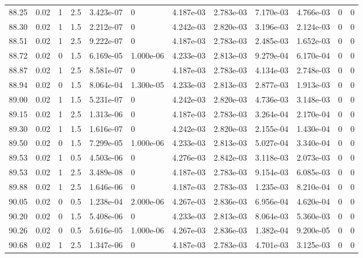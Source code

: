 \documentclass[preview]{standalone}
\begin{document}
{{{{{{{{{{{{{\begin{tabular}{L{1.2cm}C{1.2cm} C{0.3cm}C{0.5cm} C{1.4cm}C{1.4cm} C{1.4cm}C{1.4cm} C{1.6cm}C{1.6cm} C{1.6cm}C{1.6cm}}
  88.25  &  0.02  & 1     & 2.5 &  3.423e-07  & 0  &  4.187e-03&   2.783e-03& 7.170e-03 & 4.766e-03   &  0 & 0  \\ 
  88.30  &  0.02  & 1     & 1.5 &  2.212e-07  & 0  &  4.242e-03&   2.820e-03& 3.196e-03 & 2.124e-03   &  0 & 0  \\ 
  88.51  &  0.02  & 1     & 2.5 &  9.222e-07  & 0  &  4.187e-03&   2.783e-03& 2.485e-03 & 1.652e-03   &  0 & 0  \\ 
  88.72  &  0.02  & 0     & 1.5 &  6.169e-05  & 1.000e-06  &  4.233e-03&   2.813e-03& 9.279e-04 & 6.170e-04   &  0 & 0  \\ 
  88.87  &  0.02  & 1     & 2.5 &  8.581e-07  & 0  &  4.187e-03&   2.783e-03& 4.134e-03 & 2.748e-03   &  0 & 0  \\ 
  88.94  &  0.02  & 0     & 1.5 &  8.064e-04  & 1.300e-05  &  4.233e-03&   2.813e-03& 2.877e-03 & 1.913e-03   &  0 & 0  \\ 
  89.00  &  0.02  & 1     & 1.5 &  5.231e-07  & 0  &  4.242e-03&   2.820e-03& 4.736e-03 & 3.148e-03   &  0 & 0  \\ 
  89.15  &  0.02  & 1     & 2.5 &  1.313e-06  & 0  &  4.187e-03&   2.783e-03& 3.264e-04 & 2.170e-04   &  0 & 0  \\ 
  89.30  &  0.02  & 1     & 1.5 &  1.616e-07  & 0  &  4.242e-03&   2.820e-03& 2.155e-04 & 1.430e-04   &  0 & 0  \\ 
  89.50  &  0.02  & 0     & 1.5 &  7.299e-05  & 1.000e-06  &  4.233e-03&   2.813e-03& 5.027e-04 & 3.340e-04   &  0 & 0  \\ 
  89.53  &  0.02  & 1     & 0.5 &  4.503e-06  & 0  &  4.276e-03&   2.842e-03& 3.118e-03 & 2.073e-03   &  0 & 0  \\ 
  89.53  &  0.02  & 1     & 2.5 &  3.489e-08  & 0  &  4.187e-03&   2.783e-03& 9.154e-03 & 6.085e-03   &  0 & 0  \\ 
  89.88  &  0.02  & 1     & 2.5 &  1.646e-06  & 0  &  4.187e-03&   2.783e-03& 1.235e-03 & 8.210e-04   &  0 & 0  \\ 
  90.05  &  0.02  & 0     & 0.5 &  1.238e-04  & 2.000e-06  &  4.267e-03&   2.836e-03& 6.956e-04 & 4.620e-04   &  0 & 0  \\ 
  90.20  &  0.02  & 0     & 1.5 &  5.408e-06  & 0  &  4.233e-03&   2.813e-03& 8.064e-03 & 5.360e-03   &  0 & 0  \\ 
  90.26  &  0.02  & 0     & 0.5 &  5.616e-05  & 1.000e-06  &  4.267e-03&   2.836e-03& 1.382e-04 & 9.200e-05   &  0 & 0  \\ 
  90.68  &  0.02  & 1     & 2.5 &  1.347e-06  & 0  &  4.187e-03&   2.783e-03& 4.701e-03 & 3.125e-03   &  0 & 0  \\ 

\end{tabular}}}}}}}}}}}}}}
\end{document}
